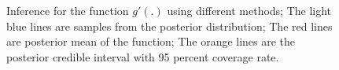 \documentclass{article}
\begin{document}
\begin{figure}[p]
{    }
    \caption{Inference for the function $g'(.)$ using different methods; The light blue lines are samples from the posterior distribution; The red lines are posterior mean of the function; The orange lines are the posterior credible interval with 95 percent coverage rate.}
    \label{fig:sim2func_1deriv}
\end{figure}
\end{document}
